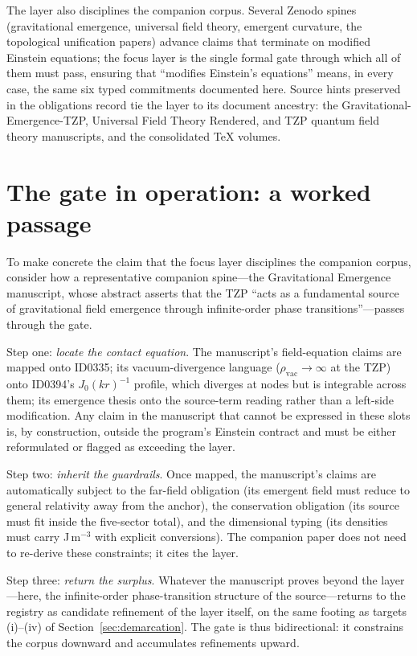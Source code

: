 \documentclass[11pt]{article}
\theoremstyle{remark}
\begin{document}
The layer also disciplines the companion corpus. Several Zenodo spines (gravitational emergence, universal field theory, emergent curvature, the topological unification papers) advance claims that terminate on modified Einstein equations; the focus layer is the single formal gate through which all of them must pass, ensuring that ``modifies Einstein's equations'' means, in every case, the same six typed commitments documented here. Source hints preserved in the obligations record tie the layer to its document ancestry: the Gravitational-Emergence-TZP, Universal Field Theory Rendered, and TZP quantum field theory manuscripts, and the consolidated TeX volumes.

\section{The gate in operation: a worked passage}
\label{sec:gate}

To make concrete the claim that the focus layer disciplines the companion corpus, consider how a representative companion spine---the Gravitational Emergence manuscript, whose abstract asserts that the TZP ``acts as a fundamental source of gravitational field emergence through infinite-order phase transitions''---passes through the gate.

Step one: \emph{locate the contact equation}. The manuscript's field-equation claims are mapped onto ID0335; its vacuum-divergence language ($\rho_{\mathrm{vac}} \to \infty$ at the TZP) onto ID0394's $J_0(kr)^{-1}$ profile, which diverges at nodes but is integrable across them; its emergence thesis onto the source-term reading rather than a left-side modification. Any claim in the manuscript that cannot be expressed in these slots is, by construction, outside the program's Einstein contract and must be either reformulated or flagged as exceeding the layer.

Step two: \emph{inherit the guardrails}. Once mapped, the manuscript's claims are automatically subject to the far-field obligation (its emergent field must reduce to general relativity away from the anchor), the conservation obligation (its source must fit inside the five-sector total), and the dimensional typing (its densities must carry J\,m$^{-3}$ with explicit conversions). The companion paper does not need to re-derive these constraints; it cites the layer.

Step three: \emph{return the surplus}. Whatever the manuscript proves beyond the layer---here, the infinite-order phase-transition structure of the source---returns to the registry as candidate refinement of the layer itself, on the same footing as targets (i)--(iv) of Section~\ref{sec:demarcation}. The gate is thus bidirectional: it constrains the corpus downward and accumulates refinements upward.
\end{document}
